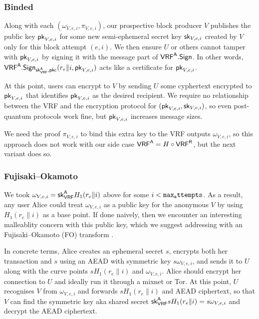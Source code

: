 \subsubsection{Binded}

Along with each $(\omega_{V,e,i},\pi_{V,e,i})$, our prospective block producer $V$ publishes the public key $\mathsf{pk}_{V,e,i}$ for some new semi-ephemeral secret key $\mathsf{sk}_{V,e,i}$ created by $V$ only for this block attempt $(e,i)$.  We then ensure $U$ or others cannot tamper with $\mathsf{pk}_{V,e,i}$ by signing it with the message part of $\mathsf{VRF}^{\mathsf{A}}.\mathsf{Sign}$.  In other words, $\mathsf{VRF}^{\mathsf{A}}.\mathsf{Sign}_{\mathsf{sk}_{\mathsf{VRF}}^{\mathsf{A}},\mathsf{pkc}}(r_e \| i, \mathsf{pk}_{V,e,i})$ acts like a certificate for $\mathsf{pk}_{V,e,i}$.

At this point, users can encrypt to $V$ by sending $U$ some cyphertext encrypted to $\mathsf{pk}_{V,e,i}$ that identifies $\mathsf{pk}_{V,e,i}$ as the desired recipient.  We require no relationship between the VRF and the encryption protocol for $(\mathsf{pk}_{V,e,i},\mathsf{sk}_{V,e,i})$, so even post-quantum protocols work fine, but $\mathsf{pk}_{V,e,i}$ increases message sizes.

We need the proof $\pi_{V,e,i}$ to bind this extra key to the VRF outputs $\omega_{V,e,i}$, so this approach does not work with our side case $\mathsf{VRF}^{\mathsf{A}} = H \circ \mathsf{VRF}^{\mathsf{R}}$, but the next variant does so.

\subsubsection{Fujisaki–Okamoto}

We took $\omega_{V,e,i} = \mathsf{sk}_{\mathsf{VRF}}^{\mathsf{A}} H_1(r_e \| i)$ above for some $i < \mathtt{max_attempts}$.  As a result, any user Alice could treat $\omega_{V,e,i}$ as a public key for the anonymous $V$ by using $H_1(r_e \| i)$ as a base point.  If done naively, then we encounter an interesting malleablity concern with this public key, which we suggest addressing with an Fujisaki–Okamoto (FO) transform \cite{FO_transform}.  

In concrete terms, Alice creates an ephemeral secret $s$, encrypts both her transaction and $s$ using an AEAD with symmetric key $s \omega_{V,e,i}$, and sends it to $U$ along with the curve points $s H_1(r_e \| i)$ and $\omega_{V,e,i}$.  Alice should encrypt her connection to $U$ and ideally run it through a mixnet or Tor.  At this point, $U$ recognises $V$ from $\omega_{V,e,i}$ and forwards $s H_1(r_e \| i)$ and AEAD ciphertext, so that $V$ can find the symmetric key aka shared secret $\mathsf{sk}_{\mathsf{VRF}}^{\mathsf{A}} s H_1(r_e \| i) = s \omega_{V,e,i}$ and decrypt the AEAD ciphertext.

